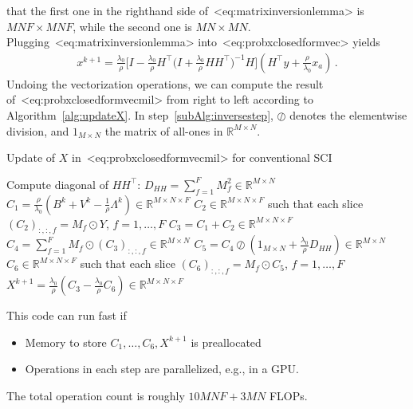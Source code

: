 \documentclass[a4paper,11pt]{article}
\def\eqref#1{<#1>}%
\begin{document}
that the first one in the righthand side of~\eqref{eq:matrixinversionlemma} is
$MNF \times MNF$, while the second one is $MN \times MN$.
Plugging~\eqref{eq:matrixinversionlemma} into~\eqref{eq:probxclosedformvec}
yields
\begin{align}
	x^{k+1}
	=
	\frac{\lambda_0}{\rho}
	\bigg[
		I - \frac{\lambda_0}{\rho}
		H^\top\big( I + \frac{\lambda_0}{\rho}H H^\top\big)^{-1}H
		\bigg]
	\left(H^\top y + \frac{\rho}{\lambda_0} x_a\right)\,.
	\label{eq:probxclosedformvecmil}
\end{align}
Undoing the vectorization operations, we can compute the result
of~\eqref{eq:probxclosedformvecmil} from right to left according to
Algorithm~\ref{alg:updateX}. In step~\ref{subAlg:inversestep}, $\oslash$ denotes
the elementwise division, and $1_{M\times N}$ the matrix of all-ones in
$\mathbb{R}^{M\times N}$.

\begin{algorithm}
	\caption{Update of $X$ in~\eqref{eq:probxclosedformvecmil} for
		conventional SCI}
	\label{alg:updateX}
	\begin{algorithmic}[1]
		\algrenewcommand{}
		\Require Compute diagonal of $HH^\top$: $D_{HH} = \sum_{f=1}^{F} M_f^2 \in \mathbb{R}^{M\times N}$
		\algrenewcommand{}
		\Require
		\State $C_1 = \frac{\rho}{\lambda_0} (B^k + V^k - \frac{1}{\rho}\Lambda^k) \in \mathbb{R}^{M\times N\times F}$
		\State $C_2 \in \mathbb{R}^{M\times N\times F}$ such that each slice
		$(C_2)_{:, :, f} = M_f \odot Y$, $f = 1, \ldots, F$
		\State $C_3 = C_1 + C_2 \in \mathbb{R}^{M \times N\times F}$
		\State $C_4 = \sum_{f=1}^{F} M_f \odot (C_3)_{:, :, f} \in \mathbb{R}^{M\times N}$
		\State $C_5 = C_4 \oslash (1_{M\times N} + \frac{\lambda_0}{\rho}D_{HH}) \in \mathbb{R}^{M\times N}$
		\label{subAlg:inversestep}
		\State $C_6 \in \mathbb{R}^{M\times N\times F}$ such that each slice
		$(C_6)_{:, :, f} = M_f \odot C_5$, $f = 1, \ldots, F$
		\State $X^{k+1} = \frac{\lambda_0}{\rho}(C_3 - \frac{\lambda_0}{\rho}C_6) \in \mathbb{R}^{M\times
				N\times F}$
	\end{algorithmic}
\end{algorithm}
This code can run fast if
\begin{itemize}
	\item Memory to store $C_1, \ldots, C_6, X^{k+1}$ is preallocated

	\item Operations in each step are parallelized, e.g., in a GPU.
\end{itemize}
The total operation count is roughly $10MNF + 3MN$ FLOPs.
\end{document}
